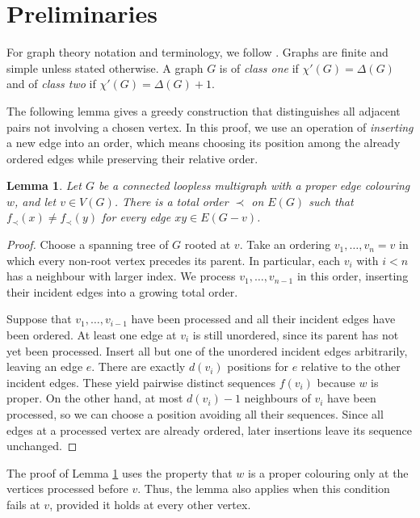 \documentclass[a4paper,12pt]{elsarticle}
\newtheorem{lemma}[theorem]{Lemma}
\begin{document}
\section{Preliminaries}

For graph theory notation and terminology, we follow \cite{Diestel}. Graphs are finite and simple unless stated otherwise. A graph $G$ is of \emph{class one} if $\chi'(G)=\Delta(G)$ and of \emph{class two} if $\chi'(G)=\Delta(G)+1$.

The following lemma gives a greedy construction that distinguishes all adjacent pairs not involving a chosen vertex. In this proof, we use an operation of \emph{inserting} a new edge into an order, which means choosing its position among the already ordered edges while preserving their relative order.

\begin{lemma} Let $G$ be a connected loopless multigraph with a proper edge colouring $w$, and let $v\in V(G)$. There is a total order $\prec$ on $E(G)$ such that $f_{\prec}(x)\neq f_{\prec}(y)$ for every edge $xy\in E(G-v)$. \label{lem: single_bad_vertex}
\end{lemma}
\begin{proof}
    Choose a spanning tree of $G$ rooted at $v$. Take an ordering $v_1,\dots,v_n=v$ in which every non-root vertex precedes its parent. In particular, each $v_i$ with $i<n$ has a neighbour with larger index. We process $v_1,\dots,v_{n-1}$ in this order, inserting their incident edges into a growing total order.

    Suppose that $v_1,\dots,v_{i-1}$ have been processed and all their incident edges have been ordered. At least one edge at $v_i$ is still unordered, since its parent has not yet been processed. Insert all but one of the unordered incident edges arbitrarily, leaving an edge $e$. There are exactly $d(v_i)$ positions for $e$ relative to the other incident edges. These yield pairwise distinct sequences $f(v_i)$ because $w$ is proper. On the other hand, at most $d(v_i)-1$ neighbours of $v_i$ have been processed, so we can choose a position avoiding all their sequences. Since all edges at a processed vertex are already ordered, later insertions leave its sequence unchanged.
\end{proof}

The proof of Lemma \ref{lem: single_bad_vertex} uses the property that $w$ is a proper colouring only at the vertices processed before $v$. Thus, the lemma also applies when this condition fails at $v$, provided it holds at every other vertex. 
\end{document}
